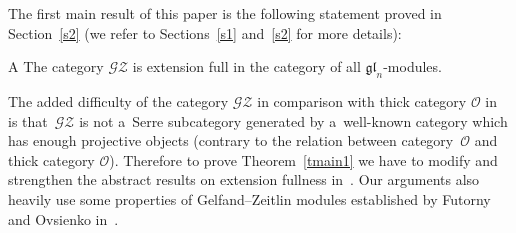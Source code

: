 The f\/irst main result of this paper is the following statement proved in Section~\ref{s2} (we refer to Sections~\ref{s1}
and~\ref{s2} for more details):

\begin{customthm}{A}
\label{tmain1}
The category $\mathscr{G}\mathscr{Z}$ is extension full in the category of all $\mathfrak{gl}_n$-modules.
\end{customthm}

The added dif\/f\/iculty of the category $\mathscr{G}\mathscr{Z}$ in comparison with thick category $\mathcal{O}$
in~\cite{CoMa} is that~$\mathscr{G}\mathscr{Z}$ is not a~Serre subcategory generated by a~well-known category which has
enough projective objects (contrary to the relation between category~$\mathcal{O}$ and thick category $\mathcal{O}$).
Therefore to prove Theorem~\ref{tmain1} we have to modify and strengthen the abstract results on extension fullness
in~\cite{CoMa}.
Our arguments also heavily use some properties of Gelfand--Zeitlin modules established by Futorny and Ovsienko
in~\cite{FuOv2}.
